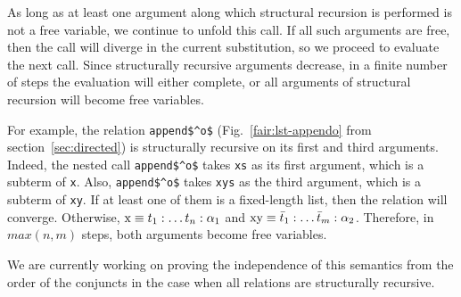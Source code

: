 
As long as at least one argument along which structural recursion is performed is not a free variable, we continue to unfold this call. If all such arguments are free, then the call
will diverge in the current substitution, so we proceed to evaluate the next call. Since structurally recursive arguments decrease, in a finite number of steps the evaluation will
either complete, or all arguments of structural recursion will become free variables.

For example, the relation \lstinline{append$^o$} (Fig.~\ref{fair:lst-appendo} from section~\ref{sec:directed}) is structurally recursive on its first and third arguments. Indeed, the nested call \lstinline{append$^o$}
takes \lstinline{xs} as its first argument, which is a subterm of \lstinline{x}. Also, \lstinline{append$^o$} takes \lstinline{xys} as the third argument, which is a subterm of
\lstinline{xy}. If at least one of them is a fixed-length list, then the relation will converge. Otherwise, $\mbox{\lstinline{x}} \equiv t_1 : \ldots t_n : \alpha_1$
and $\mbox{\lstinline{xy}} \equiv \bar{t}_1 : \ldots \bar{t}_m : \alpha_2$. Therefore, in $max(n, m)$ steps, both arguments become free variables.

We are currently working on proving the independence of this semantics from the order of the conjuncts in the case when all relations are structurally recursive.
